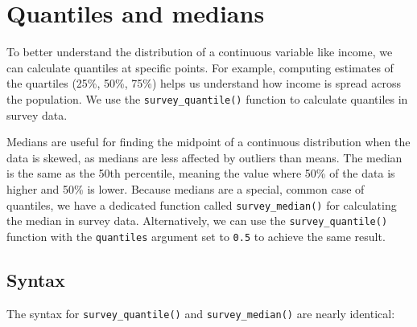 \documentclass[
]{krantz}
\begin{document}
\hypertarget{quantiles-and-medians}{%
\section{Quantiles and medians}\label{quantiles-and-medians}}

To better understand the distribution of a continuous variable like income, we can calculate quantiles at specific points. For example, computing estimates of the quartiles (25\%, 50\%, 75\%) helps us understand how income is spread across the population. We use the \texttt{survey\_quantile()} function to calculate quantiles in survey data.

Medians are useful for finding the midpoint of a continuous distribution when the data is skewed, as medians are less affected by outliers than means. The median is the same as the 50th percentile, meaning the value where 50\% of the data is higher and 50\% is lower. Because medians are a special, common case of quantiles, we have a dedicated function called \texttt{survey\_median()} for calculating the median in survey data. Alternatively, we can use the \texttt{survey\_quantile()} function with the \texttt{quantiles} argument set to \texttt{0.5} to achieve the same result.

\hypertarget{syntax-1}{%
\subsection{Syntax}\label{syntax-1}}

The syntax for \texttt{survey\_quantile()} and \texttt{survey\_median()} are nearly identical:
\end{document}
